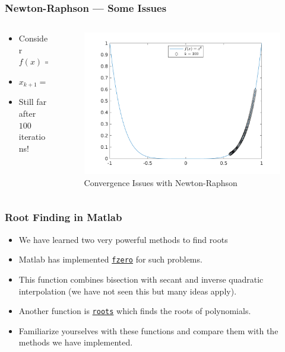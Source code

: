 \documentclass[11pt,xcolor={svgnames},aspectratio=169,usepdftitle=false,notheorems]{beamer}
\begin{document}
\begin{frame}[fragile]
  \frametitle{Newton-Raphson --- Some Issues} 
  \begin{columns}
  \begin{column}{0.39\textwidth}
  \begin{itemize}
    \item Consider $f(x) = x^6$
    \item $x_{k+1} = (5/6)x_k$
    \item Still far after $100$ iterations!
  \end{itemize}
  \end{column}
  \begin{column}{0.6\textwidth}
    \begin{figure}
      \centering
      \includegraphics[width = \textwidth]{../figures/newton_convergence_issues.png}
      \caption{Convergence Issues with Newton-Raphson}
      \label{fig:newton_convergence}
    \end{figure}
\end{column}
\end{columns}
\end{frame}

\begin{frame}
  \frametitle{Root Finding in Matlab}
\begin{itemize}
  \item We have learned two very powerful methods to find roots
  \item Matlab has implemented \href{https://www.mathworks.com/help/matlab/ref/fzero.html}{\texttt{fzero}} for such problems.
  \item This function combines bisection with secant and inverse quadratic interpolation (we have not seen this but many ideas apply).
  \item Another function is \href{https://www.mathworks.com/help/matlab/ref/roots.html}{\texttt{roots}} which finds the roots of polynomials.
  \item Familiarize yourselves with these functions and compare them with the methods we have implemented.
\end{itemize}
\end{frame}
\end{document}
